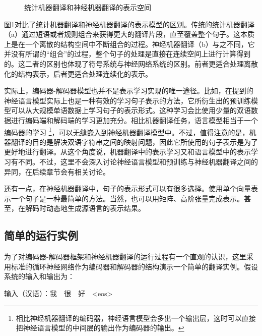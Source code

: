 \begin{figure}[htp]
    \centering
    
    \caption{统计机器翻译和神经机器翻译的表示空间}
    \label{fig:10-6}
\end{figure}

\parinterval 图\ref{fig:10-6}对比了统计机器翻译和神经机器翻译的表示模型的区别。传统的统计机器翻译（a）通过短语或者规则组合来获得更大的翻译片段，直至覆盖整个句子。这本质上是在一个离散的结构空间中不断组合的过程。神经机器翻译（b）与之不同，它并没有所谓的“组合”的过程，整个句子的处理是直接在连续空间上进行计算得到的。这二者的区别也体现了符号系统与神经网络系统的区别。前者更适合处理离散化的结构表示，后者更适合处理连续化的表示。

\parinterval 实际上，编码器-解码器模型也并不是表示学习实现的唯一途径。比如，在{\chapternine}提到的神经语言模型实际上也是一种有效的学习句子表示的方法，它所衍生出的预训练模型可以从大规模单语数据上学习句子的表示形式。这种学习会比使用少量的双语数据进行编码端和解码端的学习更加充分。相比机器翻译任务，语言模型相当于一个编码器的学习 \footnote{相比神经机器翻译的编码器，神经语言模型会多出一个输出层，这时可以直接把神经语言模型的中间层的输出作为编码器的输出。}，可以无缝嵌入到神经机器翻译模型中。不过，值得注意的是，机器翻译的目的是解决双语字符串之间的映射问题，因此它所使用的句子表示是为了更好地进行翻译。从这个角度说，机器翻译中的表示学习又和语言模型中的表示学习有不同。不过，这里不会深入讨论神经语言模型和预训练与神经机器翻译之间的异同，在后续章节会有相关讨论。

\parinterval 还有一点，在神经机器翻译中，句子的表示形式可以有很多选择。使用单个向量表示一个句子是一种最简单的方法。当然，也可以用矩阵、高阶张量完成表示。甚至，在解码时动态地生成源语言的表示结果。

\subsection{简单的运行实例}

\parinterval 为了对编码器-解码器框架和神经机器翻译的运行过程有一个直观的认识，这里采用标准的循环神经网络作为编码器和解码器的结构演示一个简单的翻译实例。假设系统的输入和输出为：

\vspace{0.5em}
\parinterval  \hspace{5em} 输入（汉语）：我\ \ 很\ \  好\ \ <eos>

